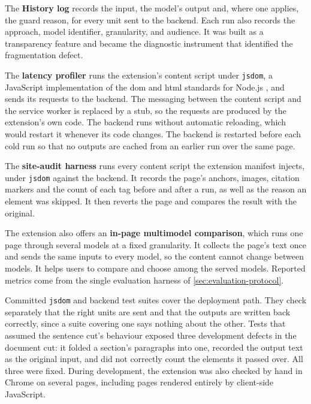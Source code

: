 The \textbf{History log} records the input, the model's output and, where one applies, the guard reason, for every unit sent to the backend.
Each run also records the approach, model identifier, granularity, and audience.
It was built as a transparency feature and became the diagnostic instrument that identified the fragmentation defect.

The \textbf{latency profiler} runs the extension's content script under \texttt{jsdom}, a JavaScript implementation of the \gls{dom} and \gls{html} standards for Node.js \parencite{jsdom2026}, and sends its requests to the backend.
The messaging between the content script and the service worker is replaced by a stub, so the requests are produced by the extension's own code.
The backend runs without automatic reloading, which would restart it whenever its code changes.
The backend is restarted before each cold run so that no outputs are cached from an earlier run over the same page.

The \textbf{site-audit harness} runs every content script the extension manifest injects, under \texttt{jsdom} against the backend.
It records the page's anchors, images, citation markers and the count of each tag before and after a run, as well as the reason an element was skipped.
It then reverts the page and compares the result with the original.

The extension also offers an \textbf{in-page multimodel comparison}, which runs one page through several models at a fixed granularity.
It collects the page's text once and sends the same inputs to every model, so the content cannot change between models.
It helps users to compare and choose among the served models.
Reported metrics come from the single evaluation harness of \cref{sec:evaluation-protocol}.

Committed \texttt{jsdom} and backend test suites cover the deployment path.
They check separately that the right units are sent and that the outputs are written back correctly, since a suite covering one says nothing about the other.
Tests that assumed the sentence cut's behaviour exposed three development defects in the document cut: it folded a section's paragraphs into one, recorded the output text as the original input, and did not correctly count the elements it passed over.
All three were fixed.
During development, the extension was also checked by hand in Chrome on several pages, including pages rendered entirely by client-side JavaScript.

